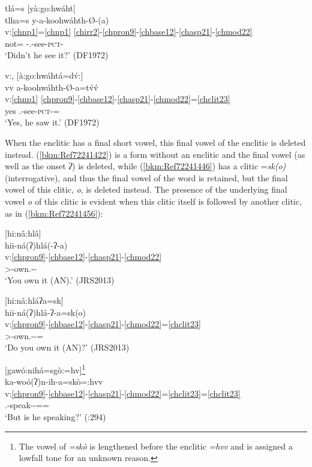 \documentclass[output=paper]{langscibook}
\begin{document}
\ea\label{bkm:Ref72241361}tlá=s [yà:go:hwáht] \\
\glll tlha=s y-a-koohwáhth-Ø-(a) \\
v:\ref{chnp1}=\ref{chnp1} \ref{chirr2}-\ref{chpron9}-\ref{chbase12}-\ref{chasp21}-\ref{chmod22}\\ 
not=\Q{} \Irr{}-\Third\Sg.\Aarg{}-see-\textsc{pct}-\Ind{}\\
\glt `Didn't he see it?' (DF1972)
\z 

\newpage
\ea\label{bkm:Ref72241368}v:, [à:go:hwáhtá=d\'{v}:] \\
\glll vv a-koohwáhth-Ø-a=tv́v́\\
v:\ref{chnp1} \ref{chpron9}-\ref{chbase12}-\ref{chasp21}-\ref{chmod22}=\ref{chclit23}\\
yes \Third\Sg.\Aarg{}-see-\textsc{pct}-\Ind{}=\Emph{}\\
\glt `Yes, he saw it.' (DF1972)
\z 

When the enclitic has a final short vowel, this final vowel of the enclitic is deleted instead. (\ref{bkm:Ref72241422}) is a form without an enclitic and the final vowel (as well as the onset \textit{ʔ}) is deleted, while (\ref{bkm:Ref72241446}) has a clitic =\textit{sk(o)} (interrogative), and thus the final vowel of the word is retained, but the final vowel of this clitic, \textit{o}, is deleted instead. The presence of the underlying final vowel \textit{o} of this clitic is evident when this clitic itself is followed by another clitic, as in (\ref{bkm:Ref72241456}):

\ea\label{bkm:Ref72241422}[hi:nâ:hlâ] \\
\glll hii-ná(ʔ)hlá(-ʔ-a) \\
v:\ref{chpron9}-\ref{chbase12}-\ref{chasp21}-\ref{chmod22}\\ 
\Second\Sg>\An{}-own.\An{}-\Prs{}-\Ind{}\\ 
\glt `You own it (AN).' (JRS2013)
\z 

\ea\label{bkm:Ref72241446}[hi:nâ:hláʔa=sk] \\
\glll hii-ná(ʔ)hlá-ʔ-a=sk(o)\\
v:\ref{chpron9}-\ref{chbase12}-\ref{chasp21}-\ref{chmod22}=\ref{chclit23}\\
\Second\Sg>\An{}-own.\An{}-\Prs{}-\Ind{}=\Q{}\\
\glt `Do you own it (AN)?' (JRS2013)
\z 

\ea\label{bkm:Ref72241456}[gawó:nihá=sgò:=hv]\footnote{The vowel of \textit{=skò} is lengthened before the enclitic \textit{=hvv} and is assigned a lowfall tone for an unknown reason.} \\
\glll ka-woó(ʔ)n-ih-a=skò=:hvv\\
v:\ref{chpron9}-\ref{chbase12}-\ref{chasp21}-\ref{chmod22}=\ref{chclit23}=\ref{chclit23}\\ 
\Third\Sg.\Aarg{}-speak-\Prs{}-\Ind{}=\Q{}=\Cntr{}\\
\glt `But is he speaking?' (\citealt{PulteFeeling1975}:294)
\z 
\end{document}
